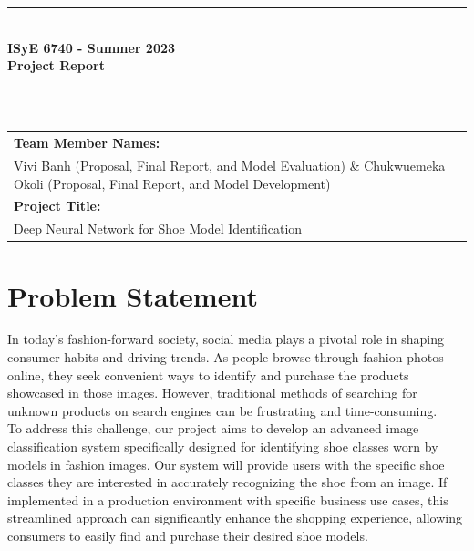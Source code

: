 \documentclass[11pt,a4paper]{article}
\begin{document}

\begin{titlepage}
	\clearpage\thispagestyle{empty}
	\centering
	\vspace{1cm}
		
	\rule{\linewidth}{1mm} \\[0.5cm]
	{ \Large \bfseries ISyE 6740 - Summer 2023\\[0.2cm]
		Project Report}\\[0.5cm]
	\rule{\linewidth}{1mm} \\[1cm]

		\begin{tabular}{l p{5cm}}
		\centering
		\textbf{Team Member Names:} \\Vivi Banh (Proposal, Final Report, and Model Evaluation) \& Chukwuemeka Okoli (Proposal, Final Report, and Model Development) \\[10pt]
		\centering
		\textbf{Project Title:} \\Deep Neural Network for Shoe Model Identification  \\[10pt]
		\end{tabular} 

\end{titlepage}	
	

\section{Problem Statement}\label{sec1}
In today's fashion-forward society, social media plays a pivotal role in shaping consumer habits and driving trends. As people browse through fashion photos online, they seek convenient ways to identify and purchase the products showcased in those images. However, traditional methods of searching for unknown products on search engines can be frustrating and time-consuming.  \\

\noindent
To address this challenge, our project aims to develop an advanced image classification system specifically designed for identifying shoe classes worn by models in fashion images. Our system will provide users with the specific shoe classes they are interested in accurately recognizing the shoe from an image. If implemented in a production environment with specific business use cases, this streamlined approach can significantly enhance the shopping experience, allowing consumers to easily find and purchase their desired shoe models.\\
\end{document}
